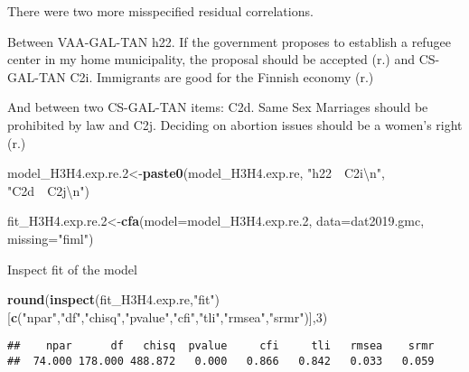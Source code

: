 \documentclass[
]{article}
\newenvironment{Shaded}{\begin{snugshade}}{\end{snugshade}}
\newcommand{\CharTok}[1]{\textcolor[rgb]{0.31,0.60,0.02}{#1}}
\newcommand{\DataTypeTok}[1]{\textcolor[rgb]{0.13,0.29,0.53}{#1}}
\newcommand{\DecValTok}[1]{\textcolor[rgb]{0.00,0.00,0.81}{#1}}
\newcommand{\FloatTok}[1]{\textcolor[rgb]{0.00,0.00,0.81}{#1}}
\newcommand{\KeywordTok}[1]{\textcolor[rgb]{0.13,0.29,0.53}{\textbf{#1}}}
\newcommand{\NormalTok}[1]{#1}
\newcommand{\StringTok}[1]{\textcolor[rgb]{0.31,0.60,0.02}{#1}}
\begin{document}
There were two more misspecified residual correlations.

Between VAA-GAL-TAN h22. If the government proposes to establish a
refugee center in my home municipality, the proposal should be accepted
(r.) and CS-GAL-TAN C2i. Immigrants are good for the Finnish economy
(r.)

And between two CS-GAL-TAN items: C2d. Same Sex Marriages should be
prohibited by law and C2j. Deciding on abortion issues should be a
women's right (r.)

\begin{Shaded}
\begin{Highlighting}[]
\NormalTok{model_H3H4.exp.re}\FloatTok{.2}\NormalTok{<-}\KeywordTok{paste0}\NormalTok{(model_H3H4.exp.re,}
                      \StringTok{"h22~~C2i}\CharTok{\textbackslash{}n}\StringTok{"}\NormalTok{,}
                      \StringTok{"C2d~~C2j}\CharTok{\textbackslash{}n}\StringTok{"}\NormalTok{)}
\end{Highlighting}
\end{Shaded}

\begin{Shaded}
\begin{Highlighting}[]
\NormalTok{fit_H3H4.exp.re}\FloatTok{.2}\NormalTok{<-}\KeywordTok{cfa}\NormalTok{(}\DataTypeTok{model=}\NormalTok{model_H3H4.exp.re}\FloatTok{.2}\NormalTok{,}
              \DataTypeTok{data=}\NormalTok{dat2019.gmc,}
              \DataTypeTok{missing=}\StringTok{"fiml"}\NormalTok{)}
\end{Highlighting}
\end{Shaded}

Inspect fit of the model

\begin{Shaded}
\begin{Highlighting}[]
\KeywordTok{round}\NormalTok{(}\KeywordTok{inspect}\NormalTok{(fit_H3H4.exp.re,}\StringTok{"fit"}\NormalTok{)}
\NormalTok{      [}\KeywordTok{c}\NormalTok{(}\StringTok{"npar"}\NormalTok{,}\StringTok{"df"}\NormalTok{,}\StringTok{"chisq"}\NormalTok{,}\StringTok{"pvalue"}\NormalTok{,}\StringTok{"cfi"}\NormalTok{,}\StringTok{"tli"}\NormalTok{,}\StringTok{"rmsea"}\NormalTok{,}\StringTok{"srmr"}\NormalTok{)],}\DecValTok{3}\NormalTok{)}
\end{Highlighting}
\end{Shaded}

\begin{verbatim}
##    npar      df   chisq  pvalue     cfi     tli   rmsea    srmr 
##  74.000 178.000 488.872   0.000   0.866   0.842   0.033   0.059
\end{verbatim}
\end{document}
